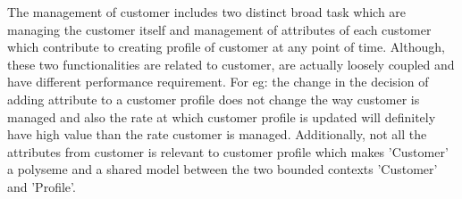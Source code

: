The management of customer includes two distinct broad task which are managing the customer itself and management of attributes of each customer which contribute to creating profile of customer at any point of time. Although, these two functionalities are related to customer, are actually loosely coupled and have different performance requirement. For eg: the change in the decision of adding attribute to a customer profile does not change the way customer is managed and also the rate at which customer profile is updated will definitely have high value than the rate customer is managed. Additionally, not all the attributes from customer is relevant to customer profile which makes 'Customer' a polyseme and a shared model between the two bounded contexts 'Customer' and 'Profile'.\\


